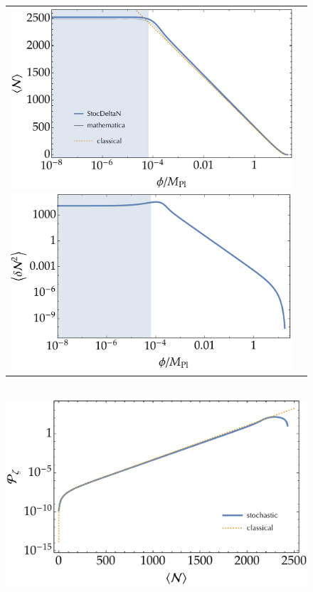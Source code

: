 \documentclass[aps, prd
, preprint
, nofootinbib 
, longbibliography
]{revtex4-1}
\begin{document}
\begin{figure}
	\centering
	\begin{tabular}{cc}
		\begin{minipage}{0.5\hsize}
			\centering
			\includegraphics[width=0.9\hsize]{figs/hilltop/N_conf.pdf}
		\end{minipage}
		\begin{minipage}{0.5\hsize}
			\centering
			\includegraphics[width=0.9\hsize]{figs/hilltop/dN2_conf.pdf}
		\end{minipage}
	\end{tabular} \\[10pt]
	\includegraphics[width=0.5\hsize]{figs/hilltop/Pzeta_conf.pdf}
	\caption{}
	\label{figs: hilltop_conf}
\end{figure}
\end{document}
